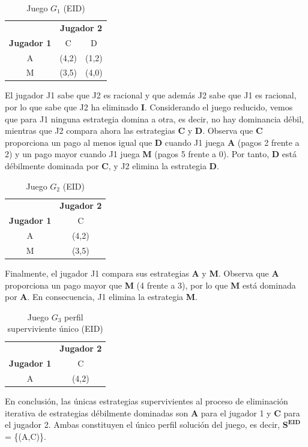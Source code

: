 \documentclass[12pt,a4paper,]{book}
\numberwithin{dummy}{section}
\theoremstyle{ocrenumbox}
\theoremstyle{blacknumex}
\theoremstyle{blacknumbox}
\theoremstyle{ocrenum}
\theoremstyle{ocrenum}
\begin{document}
\begin{tcolorbox}[colback=blue!10]
\begin{table}[H]
\centering
\begin{tabular}{c|cc}
 & \multicolumn{2}{c}{\textbf{Jugador 2}} \\ 
\textbf{Jugador 1} & C & D\\ \hline
A & (4,2) & (1,2)\\
M & (3,5) & (4,0)
\end{tabular}
\caption{Juego $G_1$ (EID)}
\label{tab:EID}
\end{table}

El jugador J1 sabe que J2 es racional y que además J2 sabe que J1 es racional, por lo que sabe que J2 ha eliminado \textbf{I}. Considerando el juego reducido, vemos que para J1 ninguna estrategia domina a otra, es decir, no hay dominancia débil, mientras que J2 compara ahora las estrategias \textbf{C} y \textbf{D}. Observa que \textbf{C} proporciona un pago al menos igual que \textbf{D} cuando J1 juega \textbf{A} (pagos 2 frente a 2) y un pago mayor cuando J1 juega \textbf{M} (pagos 5 frente a 0). Por tanto, \textbf{D} está débilmente dominada por \textbf{C}, y J2 elimina la estrategia \textbf{D}.

\begin{table}[H]
\centering
\begin{tabular}{c|c}
 & \multicolumn{1}{c}{\textbf{Jugador 2}} \\ 
\textbf{Jugador 1} & C\\ \hline
A & (4,2)\\
M & (3,5)
\end{tabular}
\caption{Juego $G_2$ (EID)}
\label{tab:EID}
\end{table}

Finalmente, el jugador J1 compara sus estrategias \textbf{A} y \textbf{M}. Observa que \textbf{A} proporciona un pago mayor que \textbf{M} (4 frente a 3), por lo que \textbf{M} está dominada por \textbf{A}. En consecuencia, J1 elimina la estrategia \textbf{M}.

\begin{table}[H]
\centering
\begin{tabular}{c|c}
 & \multicolumn{1}{c}{\textbf{Jugador 2}} \\ 
\textbf{Jugador 1} & C\\ \hline
A & (4,2)
\end{tabular}
\caption{Juego $G_3$ perfil superviviente único (EID)}
\label{tab:EID}
\end{table}

En conclusión, las únicas estrategias supervivientes al proceso de eliminación iterativa de estrategias débilmente dominadas son \textbf{A} para el jugador 1 y \textbf{C} para el jugador 2. Ambas constituyen el único perfil solución del juego, es decir, $\mathbf{S^{EID}}$ = \{(A,C)\}.
\end{tcolorbox}
\end{document}
